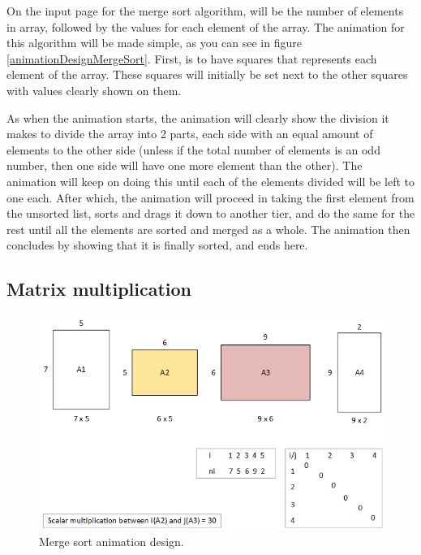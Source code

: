 On the input page for the merge sort algorithm, will be the number of elements in array, followed by the values for each element of the array. The animation for this algorithm will be made simple, as you can see in figure \ref{animationDesignMergeSort}. First, is to have squares that represents each element of the array. These squares will initially be set next to the other squares with values clearly shown on them.

As when the animation starts, the animation will clearly show the division it makes to divide the array into 2 parts, each side with an equal amount of elements to the other side (unless if the total number of elements is an odd number, then one side will have one more element than the other). The animation will keep on doing this until each of the elements divided will be left to one each. After which, the animation will proceed in taking the first element from the unsorted list, sorts and drags it down to another tier, and do the same for the rest until all the elements are sorted and merged as a whole. The animation then concludes by showing that it is finally sorted, and ends here.

\newpage



\newpage

\subsection{Matrix multiplication}

\begin{figure}[H]
\centering
\includegraphics[scale=0.9]{images/report_images/animationDesignMatrixMultiplication.png}
\caption{Merge sort animation design.}
\label{animationDesignMatrixMultiplication}
\end{figure}

